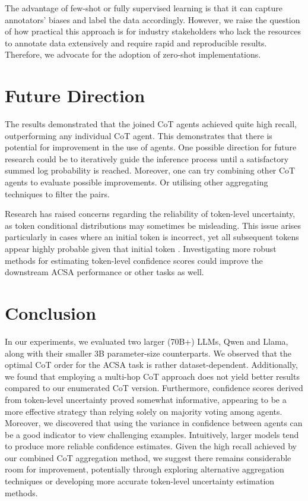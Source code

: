 \documentclass[11pt]{article}
\begin{document}
The advantage of few-shot or fully supervised learning is that it can capture annotators' biases and label the data accordingly. However, we raise the question of how practical this approach is for industry stakeholders who lack the resources to annotate data extensively and require rapid and reproducible results. Therefore, we advocate for the adoption of zero-shot implementations.

\section{Future Direction}
The results demonstrated that the joined CoT agents achieved quite high recall, outperforming any individual CoT agent. This demonstrates that there is potential for improvement in the use of agents. One possible direction for future research could be to iteratively guide the inference process until a satisfactory summed log probability is reached. Moreover, one can try combining other CoT agents to evaluate possible improvements. Or utilising other aggregating techniques to filter the pairs.

Research has raised concerns regarding the reliability of token-level uncertainty, as token conditional distributions may sometimes be misleading. This issue arises particularly in cases where an initial token is incorrect, yet all subsequent tokens appear highly probable given that initial token \citep{shorinwa2024surveyuncertaintyquantificationlarge}. Investigating more robust methods for estimating token-level confidence scores could improve the downstream ACSA performance or other tasks as well.





\section{Conclusion}
 In our experiments, we evaluated two larger (70B+) LLMs, Qwen and Llama, along with their smaller 3B parameter-size counterparts. We observed that the optimal CoT order for the ACSA task is rather dataset-dependent. Additionally, we found that employing a multi-hop CoT approach does not yield better results compared to our enumerated CoT version. Furthermore, confidence scores derived from token-level uncertainty proved somewhat informative, appearing to be a more effective strategy than relying solely on majority voting among agents. Moreover, we discovered that using the variance in confidence between agents can be a good indicator to view challenging examples. Intuitively, larger models tend to produce more reliable confidence estimates. Given the high recall achieved by our combined CoT aggregation method, we suggest there remains considerable room for improvement, potentially through exploring alternative aggregation techniques or developing more accurate token-level uncertainty estimation methods.
\end{document}
